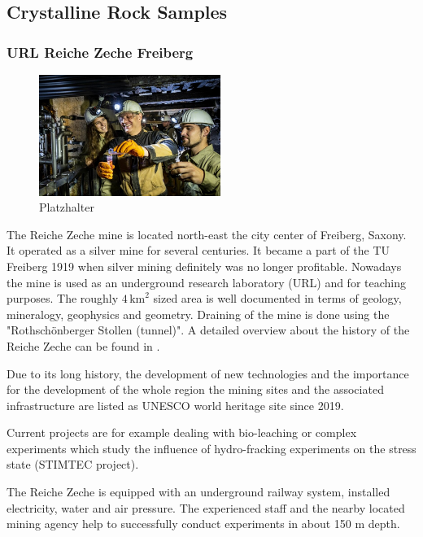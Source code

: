 \subsection{Crystalline Rock Samples}
\label{subsec:crystalline}

\subsubsection{URL Reiche Zeche Freiberg}


\begin{figure}
\centering
\includegraphics[width=5.9cm]{figures/reiche-zeche.jpg}
\caption{Platzhalter}
\end{figure}
The Reiche Zeche mine is located north-east the city center of Freiberg, Saxony. It operated as a silver mine for several centuries. It became a part of the TU Freiberg 1919 when silver mining definitely was no longer profitable. Nowadays the mine is used as an underground research laboratory (URL) and for teaching purposes. The roughly $4\,\text{km}^2$ sized area is well documented in terms of geology, mineralogy, geophysics and geometry. Draining of the mine is done using the "Rothsch\"onberger Stollen (tunnel)". A detailed overview about the history of the Reiche Zeche can be found in \cite{ReicheZecheHistory}.

Due to its long history, the development of new technologies and the importance for the development of the whole region the mining sites and the associated infrastructure are listed as UNESCO world heritage site since 2019.

Current projects are for example dealing with bio-leaching or complex experiments which study the influence of hydro-fracking experiments on the stress state (STIMTEC project).

The Reiche Zeche is equipped with an underground railway system, installed electricity, water and air pressure. The experienced staff and the nearby located mining agency help to successfully conduct experiments in about 150 m depth. 

